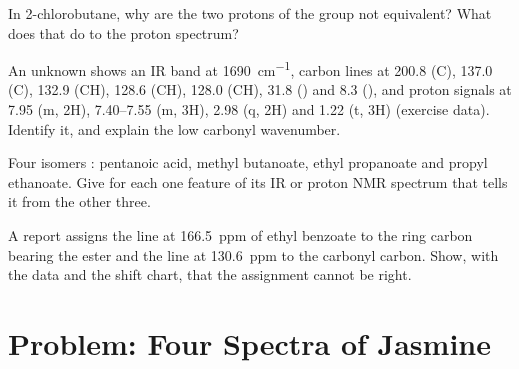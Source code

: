 \begin{exercise}[$\star\star$]\label{exo:b2:structure-determination:9}
In 2-chlorobutane, why are the two protons of the  group not equivalent? What does that do to
the proton spectrum?
\end{exercise}

\begin{exercise}[$\star\star\star$]\label{exo:b2:structure-determination:10}
An unknown  shows an IR band at \qty{1690}{cm^{-1}}, carbon lines at 200.8 (C), 137.0 (C),
132.9 (CH), 128.6 (CH), 128.0 (CH), 31.8 () and 8.3 (), and proton signals at 7.95 (m,
2H), 7.40--7.55 (m, 3H), 2.98 (q, 2H) and 1.22 (t, 3H) (exercise data). Identify it, and explain the
low carbonyl wavenumber.
\end{exercise}

\begin{exercise}[$\star\star\star$]\label{exo:b2:structure-determination:11}
Four isomers : pentanoic acid, methyl butanoate, ethyl propanoate and propyl ethanoate.
Give for each one feature of its IR or proton NMR spectrum that tells it from the other three.
\end{exercise}

\begin{exercise}[$\star\star\star$]\label{exo:b2:structure-determination:12}
A report assigns the line at 166.5~ppm of ethyl benzoate to the ring carbon bearing the ester and
the line at 130.6~ppm to the carbonyl carbon. Show, with the  data and the shift chart, that the
assignment cannot be right.
\end{exercise}

\section{Problem: Four Spectra of Jasmine}

